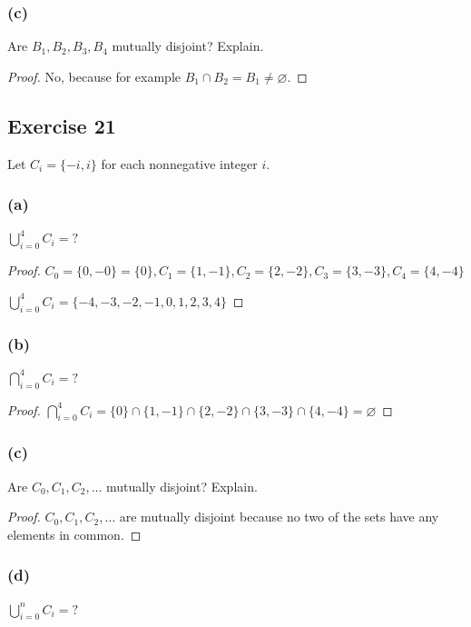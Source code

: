 \documentclass[14pt]{extarticle}
\newcommand{\es}{\varnothing}
\newcommand{\dps}{\displaystyle}
\begin{document}
\subsubsection{(c)}
Are \(B_1, B_2, B_3, B_4\) mutually disjoint? Explain.

\begin{proof}
No, because for example \(B_1 \cap B_2 = B_1 \neq \es\).
\end{proof}

\subsection{Exercise 21}
Let \(C_i = \{-i, i\}\) for each nonnegative integer $i$.

\subsubsection{(a)}
\(\dps \bigcup_{i=0}^{4}C_i = ?\)

\begin{proof}
\(C_0 = \{0, -0\} = \{0\}, C_1 = \{1, -1\}, C_2 = \{2, -2\}, C_3 = \{3, -3\}, C_4 = \{4, -4\}\)

\(\dps \bigcup_{i=0}^{4}C_i = \{-4, -3, -2, -1, 0, 1, 2, 3, 4\}\)
\end{proof}

\subsubsection{(b)}
\(\dps \bigcap_{i=0}^{4}C_i = ?\)

\begin{proof}
\(\dps \bigcap_{i=0}^{4}C_i = \{0\} \cap \{1, -1\} \cap \{2, -2\} \cap \{3, -3\} \cap \{4, -4\} = \es\)
\end{proof}

\subsubsection{(c)}
Are \(C_0, C_1, C_2, \ldots\) mutually disjoint? Explain.

\begin{proof}
$C_0, C_1, C_2, \ldots$ are mutually disjoint because no two of the sets have any elements in common.
\end{proof}

\subsubsection{(d)}
\(\dps \bigcup_{i=0}^{n}C_i = ?\)
\end{document}
